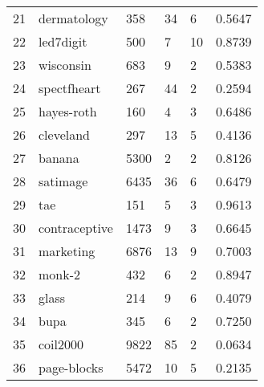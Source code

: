 \begin{table}[H]
\begin{tabular}{llllll}
21 &      dermatology &     358 &         34 &       6 &          0.5647 \\
22 &        led7digit &     500 &          7 &      10 &          0.8739 \\
23 &        wisconsin &     683 &          9 &       2 &          0.5383 \\
24 &      spectfheart &     267 &         44 &       2 &          0.2594 \\
25 &       hayes-roth &     160 &          4 &       3 &          0.6486 \\
26 &        cleveland &     297 &         13 &       5 &          0.4136 \\
27 &           banana &    5300 &          2 &       2 &          0.8126 \\
28 &         satimage &    6435 &         36 &       6 &          0.6479 \\
29 &              tae &     151 &          5 &       3 &          0.9613 \\
30 &    contraceptive &    1473 &          9 &       3 &          0.6645 \\
31 &        marketing &    6876 &         13 &       9 &          0.7003 \\
32 &           monk-2 &     432 &          6 &       2 &          0.8947 \\
33 &            glass &     214 &          9 &       6 &          0.4079 \\
34 &             bupa &     345 &          6 &       2 &          0.7250 \\
35 &         coil2000 &    9822 &         85 &       2 &          0.0634 \\
36 &      page-blocks &    5472 &         10 &       5 &          0.2135 \\
\hline
\end{tabular}
\end{table}
